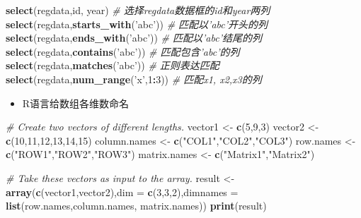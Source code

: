 \documentclass[
]{book}
\newenvironment{Shaded}{\begin{snugshade}}{\end{snugshade}}
\newcommand{\CommentTok}[1]{\textcolor[rgb]{0.56,0.35,0.01}{\textit{#1}}}
\newcommand{\DataTypeTok}[1]{\textcolor[rgb]{0.13,0.29,0.53}{#1}}
\newcommand{\DecValTok}[1]{\textcolor[rgb]{0.00,0.00,0.81}{#1}}
\newcommand{\KeywordTok}[1]{\textcolor[rgb]{0.13,0.29,0.53}{\textbf{#1}}}
\newcommand{\NormalTok}[1]{#1}
\newcommand{\OperatorTok}[1]{\textcolor[rgb]{0.81,0.36,0.00}{\textbf{#1}}}
\newcommand{\StringTok}[1]{\textcolor[rgb]{0.31,0.60,0.02}{#1}}
\providecommand{\tightlist}{%
  \setlength{\itemsep}{0pt}\setlength{\parskip}{0pt}}
\begin{document}
\begin{Shaded}
\begin{Highlighting}[]
\KeywordTok{select}\NormalTok{(regdata,id, year) }\CommentTok{# 选择regdata数据框的id和year两列}
\KeywordTok{select}\NormalTok{(regdata,}\KeywordTok{starts_with}\NormalTok{(}\StringTok{'abc'}\NormalTok{)) }\CommentTok{# 匹配以'abc'开头的列}
\KeywordTok{select}\NormalTok{(regdata,}\KeywordTok{ends_with}\NormalTok{(}\StringTok{'abc'}\NormalTok{)) }\CommentTok{# 匹配以'abc'结尾的列}
\KeywordTok{select}\NormalTok{(regdata,}\KeywordTok{contains}\NormalTok{(}\StringTok{'abc'}\NormalTok{)) }\CommentTok{# 匹配包含'abc'的列}
\KeywordTok{select}\NormalTok{(regdata,}\KeywordTok{matches}\NormalTok{(}\StringTok{'abc'}\NormalTok{)) }\CommentTok{# 正则表达匹配}
\KeywordTok{select}\NormalTok{(regdata,}\KeywordTok{num_range}\NormalTok{(}\StringTok{'x'}\NormalTok{,}\DecValTok{1}\OperatorTok{:}\DecValTok{3}\NormalTok{)) }\CommentTok{# 匹配x1, x2,x3的列}
\end{Highlighting}
\end{Shaded}

\begin{itemize}
\tightlist
\item
  R语言给数组各维数命名
\end{itemize}

\begin{Shaded}
\begin{Highlighting}[]
\CommentTok{# Create two vectors of different lengths.}
\NormalTok{vector1 <-}\StringTok{ }\KeywordTok{c}\NormalTok{(}\DecValTok{5}\NormalTok{,}\DecValTok{9}\NormalTok{,}\DecValTok{3}\NormalTok{)}
\NormalTok{vector2 <-}\StringTok{ }\KeywordTok{c}\NormalTok{(}\DecValTok{10}\NormalTok{,}\DecValTok{11}\NormalTok{,}\DecValTok{12}\NormalTok{,}\DecValTok{13}\NormalTok{,}\DecValTok{14}\NormalTok{,}\DecValTok{15}\NormalTok{)}
\NormalTok{column.names <-}\StringTok{ }\KeywordTok{c}\NormalTok{(}\StringTok{"COL1"}\NormalTok{,}\StringTok{"COL2"}\NormalTok{,}\StringTok{"COL3"}\NormalTok{)}
\NormalTok{row.names <-}\StringTok{ }\KeywordTok{c}\NormalTok{(}\StringTok{"ROW1"}\NormalTok{,}\StringTok{"ROW2"}\NormalTok{,}\StringTok{"ROW3"}\NormalTok{)}
\NormalTok{matrix.names <-}\StringTok{ }\KeywordTok{c}\NormalTok{(}\StringTok{"Matrix1"}\NormalTok{,}\StringTok{"Matrix2"}\NormalTok{)}

\CommentTok{# Take these vectors as input to the array.}
\NormalTok{result <-}\StringTok{ }\KeywordTok{array}\NormalTok{(}\KeywordTok{c}\NormalTok{(vector1,vector2),}\DataTypeTok{dim =} \KeywordTok{c}\NormalTok{(}\DecValTok{3}\NormalTok{,}\DecValTok{3}\NormalTok{,}\DecValTok{2}\NormalTok{),}\DataTypeTok{dimnames =} \KeywordTok{list}\NormalTok{(row.names,column.names,}
\NormalTok{                                                                  matrix.names))}
\KeywordTok{print}\NormalTok{(result)}
\end{Highlighting}
\end{Shaded}
\end{document}
